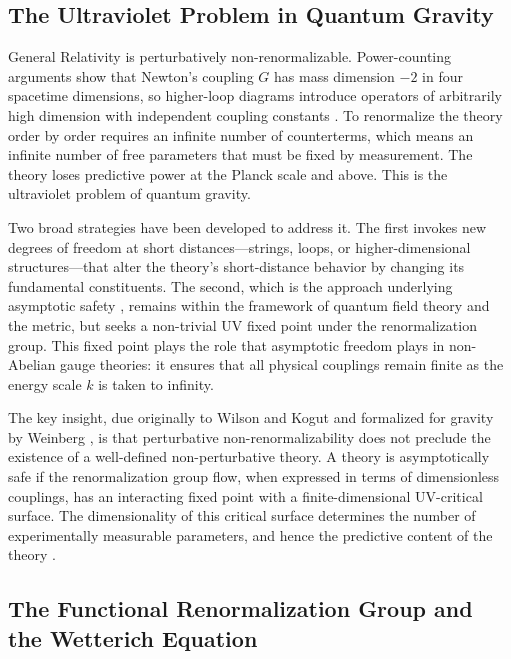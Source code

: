 \documentclass[12pt,a4paper]{article}
\begin{document}
\subsection{The Ultraviolet Problem in Quantum Gravity}

General Relativity is perturbatively non-renormalizable. Power-counting
arguments show that Newton's coupling $G$ has mass dimension $-2$ in four
spacetime dimensions, so higher-loop diagrams introduce operators of
arbitrarily high dimension with independent coupling constants \cite{Peskin1995,
Weinberg1995}. To renormalize the theory order by order requires an infinite
number of counterterms, which means an infinite number of free parameters that
must be fixed by measurement. The theory loses predictive power at the Planck
scale and above. This is the ultraviolet problem of quantum gravity.

Two broad strategies have been developed to address it. The first invokes new
degrees of freedom at short distances---strings, loops, or higher-dimensional
structures---that alter the theory's short-distance behavior by changing its
fundamental constituents. The second, which is the approach underlying
asymptotic safety \cite{Weinberg1979}, remains within the framework of quantum
field theory and the metric, but seeks a non-trivial UV fixed point under the
renormalization group. This fixed point plays the role that asymptotic freedom
plays in non-Abelian gauge theories: it ensures that all physical couplings
remain finite as the energy scale $k$ is taken to infinity.

The key insight, due originally to Wilson and Kogut \cite{WilsonKogut1974,
Wilson1971} and formalized for gravity by Weinberg \cite{Weinberg1979}, is that
perturbative non-renormalizability does not preclude the existence of a
well-defined non-perturbative theory. A theory is asymptotically safe if the
renormalization group flow, when expressed in terms of dimensionless couplings,
has an interacting fixed point with a finite-dimensional UV-critical surface.
The dimensionality of this critical surface determines the number of
experimentally measurable parameters, and hence the predictive content of the
theory \cite{ReuterSaueressig2012,Percacci2017}.

\subsection{The Functional Renormalization Group and the Wetterich Equation}
\end{document}
